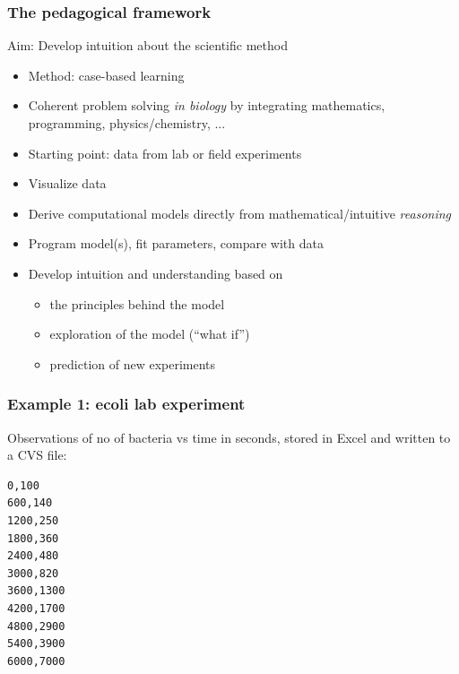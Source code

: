 \documentclass{beamer}
\begin{document}
\begin{frame}
\frametitle{The pedagogical framework}

\begin{block}{Aim: Develop intuition about the scientific method }
\begin{itemize}
 \item Method: case-based learning

 \item Coherent problem solving \emph{in biology} by integrating
   mathematics, programming, physics/chemistry, ...

 \item Starting point: data from lab or field experiments

 \item Visualize data

 \item Derive computational models directly from mathematical/intuitive \emph{reasoning}

 \item Program model(s), fit parameters, compare with data

 \item Develop intuition and understanding based on
\begin{itemize}

  \item the principles behind the model

  \item exploration of the model (``what if'')

  \item prediction of new experiments
\end{itemize}

\noindent
\end{itemize}

\noindent
\end{block}
\end{frame}

\begin{frame}
\frametitle{Example 1: ecoli lab experiment}

\begin{block}{}
Observations of no of bacteria vs time in seconds,
stored in Excel and written to a CVS file:

\begin{verbatim}
0,100
600,140
1200,250
1800,360
2400,480
3000,820
3600,1300
4200,1700
4800,2900
5400,3900
6000,7000
\end{verbatim}
\end{block}
\end{frame}
\end{document}
